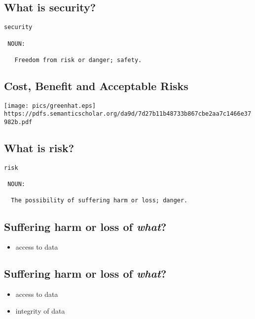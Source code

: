 \documentclass[xga]{xdvislides}
\begin{document}
\subsection{What is security?}
\Huge
\begin{verbatim}
security

 NOUN:

   Freedom from risk or danger; safety.
\end{verbatim}
\Normalsize

\subsection{Cost, Benefit and Acceptable Risks}
\vspace*{\fill}
\begin{center}
	\texttt{[image: pics/greenhat.eps]} \\
	\vspace{.25in}
	\verb+https://pdfs.semanticscholar.org/da9d/7d27b11b48733b867cbe2aa7c1466e37982b.pdf+
\end{center}
\vspace*{\fill}

\subsection{What is risk?}
\Huge
\begin{verbatim}
risk

 NOUN:

  The possibility of suffering harm or loss; danger.
\end{verbatim}
\Normalsize

\subsection{Suffering harm or loss of {\em what}?}

\begin{itemize}
	\item access to data
\end{itemize}

\subsection{Suffering harm or loss of {\em what}?}

\begin{itemize}
	\item access to data
	\item integrity of data
\end{itemize}
\end{document}
